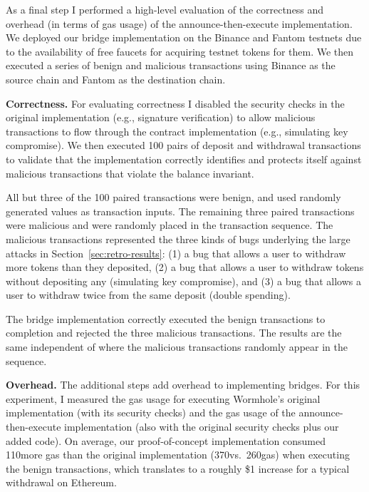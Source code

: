 As a final step I performed a high-level evaluation of the
correctness and overhead (in terms of gas usage) of the
announce-then-execute implementation.  We deployed our bridge
implementation on the Binance and Fantom testnets due to the
availability of free faucets for acquiring testnet tokens for them.
We then executed a series of benign and malicious transactions using
Binance as the source chain and Fantom as the destination chain.



\textbf{Correctness.}  For evaluating correctness I disabled the
security checks in the original implementation (e.g., signature
verification) to allow malicious transactions to flow through the
contract implementation (e.g., simulating key compromise).  We then
executed 100 pairs of deposit and withdrawal transactions to validate
that the implementation correctly identifies and protects itself
against malicious transactions that violate the balance invariant.

All but three of the 100 paired transactions were benign, and used
randomly generated values as transaction inputs.
%
The remaining three paired transactions were malicious and were
randomly placed in the transaction sequence.  The malicious
transactions represented the three kinds of bugs underlying the
large attacks in Section~\ref{sec:retro-results}: (1) a bug that
allows a user to withdraw more tokens than they deposited, (2) a bug
that allows a user to withdraw tokens without depositing any
(simulating key compromise), and (3) a bug that allows a user to
withdraw twice from the same deposit (double spending).

The bridge implementation correctly executed the benign transactions
to completion and rejected the three malicious transactions.  The
results are the same independent of where the malicious transactions
randomly appear in the sequence.

\textbf{Overhead.}  The additional steps add overhead to implementing
bridges.  For this experiment, I measured the gas usage for executing
Wormhole's original implementation (with its security checks) and the
gas usage of the announce-then-execute implementation (also with the
original security checks plus our added code).  On average, our
proof-of-concept implementation consumed 110\thou more gas than the
original implementation (370\thou vs.\ 260\thou gas) when
executing the benign transactions, which translates to a
roughly \$1 increase for a typical withdrawal on Ethereum.

